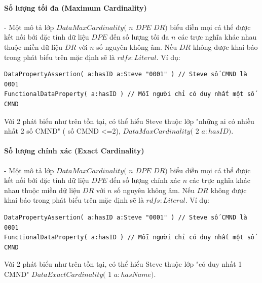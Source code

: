 \paragraph{Số lượng tối đa (Maximum Cardinality)} - Một mô tả lớp $DataMaxCardinality($ $n$ $DPE$ $DR)$ biểu diễn mọi cá thể được kết nối bởi đặc tính dữ liệu $DPE$ đến số lượng tối đa $n$ các trực nghĩa khác nhau thuộc miền dữ liệu  $DR$ với $n$ số nguyên không âm. Nếu $DR$ không được khai báo trong phát biểu trên mặc định sẽ là $rdfs:Literal$. Ví dụ:
\begin{verbatim}
DataPropertyAssertion( a:hasID a:Steve "0001" ) // Steve số CMND là 0001
FunctionalDataProperty( a:hasID ) // Mỗi người chỉ có duy nhất một số CMND
\end{verbatim}
Với 2 phát biểu như trên tồn tại, có thể hiểu Steve thuộc lớp "những ai có nhiều nhất 2 số CMND" ( số CMND <=2), $DataMaxCardinality($ $2$ $a:hasID)$.

\paragraph{Số lượng chính xác (Exact Cardinality)} - Một mô tả lớp $DataMaxCardinality($ $n$ $DPE$ $DR)$  biểu diễn mọi cá thể được kết nối bởi đặc tính dữ liệu $DPE$ đến số lượng chính xác $n$ các trực nghĩa khác nhau thuộc miền dữ liệu  $DR$ với $n$ số nguyên không âm. Nếu $DR$ không được khai báo trong phát biểu trên mặc định sẽ là $rdfs:Literal$. Ví dụ:
\begin{verbatim}
DataPropertyAssertion( a:hasID a:Steve "0001" ) // Steve số CMND là 0001
FunctionalDataProperty( a:hasID ) // Mỗi người chỉ có duy nhất một số CMND
\end{verbatim}
Với 2 phát biểu như trên tồn tại, có thể hiểu Steve thuộc lớp "có duy nhất 1 CMND" $DataExactCardinality($ $1$ $a:hasName)$.


